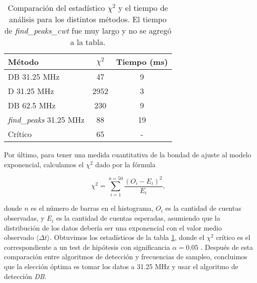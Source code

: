 \begin{table}[b]
\centering
\begin{tabular}{|l|c|c|}
    \hline
    \textbf{Método} & \boldmath$\chi^2$ & \textbf{Tiempo (ms)} \\
    \hline
    DB 31.25 MHz & 47 & 9\\
    D 31.25 MHz & 2952 & 3\\
    DB 62.5 MHz & 230 & 9 \\
    \textit{find\_peaks} 31.25 MHz & 88 & 19 \\
    Crítico & 65 & - \\
    \hline
\end{tabular}
\caption{Comparación del estadístico $\chi^2$ y el tiempo de análisis para los distintos métodos. El tiempo de \textit{find\_peaks\_cwt} fue muy largo y no se agregó a la tabla.}
\label{tab:chisq}
\end{table}

Por último, para tener una medida cuantitativa de la bondad de ajuste al modelo exponencial, calculamos el $\chi^2$ dado por la fórmula 

\begin{equation}
    \chi^2  = \sum_{i=1}^{n=50} \frac{(O_i - E_i)^2}{E_i},
\end{equation}

\noindent donde $n$ es el número de barras en el histograma, $O_i$ es la cantidad de cuentas observadas, y $E_i$ es la cantidad de cuentas esperadas, asumiendo que la distribución de los datos debería ser una exponencial con el valor medio observado $\langle \Delta t \rangle$.
Obtuvimos los estadísticos de la tabla \ref{tab:chisq}, donde el $\chi^2$ crítico es el correspondiente a un test de hipótesis con significancia $\alpha = 0.05$ \cite{frodesen_probability_1979}.
Después de esta comparación entre algoritmos de detección y frecuencias de sampleo, concluimos que la elección óptima es tomar los datos a 31.25 MHz y usar el algoritmo de detección \textit{DB}.


